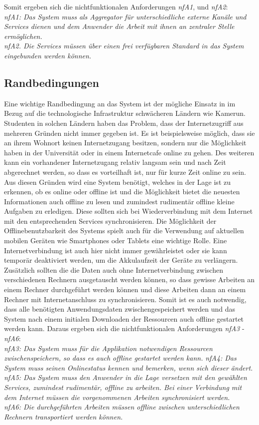 Somit ergeben sich die nichtfunktionalen Anforderungen \emph{nfA1}, und \emph{nfA2}:\\
\emph{nfA1: Das System muss als Aggregator für unterschiedliche externe Kanäle und Services dienen und dem Anwender die Arbeit mit ihnen an zentraler Stelle ermöglichen.}\\
\emph{nfA2. Die Services müssen über einen frei verfügbaren Standard in das System eingebunden werden können.}

\subsection{Randbedingungen}
Eine wichtige Randbedingung an das System ist der mögliche Einsatz in im Bezug auf die technologische Infrastruktur schwächeren Ländern wie Kamerun. Studenten in solchen Ländern  haben das Problem, dass der Internetzugriff aus mehreren Gründen nicht immer gegeben ist. Es ist beispielsweise möglich, dass sie an ihrem Wohnort keinen Internetzugang besitzen, sondern nur die Möglichkeit haben in der Universität oder in einem Internetcafe online zu gehen. Des weiteren kann ein vorhandener Internetzugang relativ langsam sein und nach Zeit abgerechnet werden, so dass es vorteilhaft ist, nur für kurze Zeit online zu sein. Aus diesen Gründen wird eine System benötigt, welches in der Lage ist zu erkennen, ob es online oder offline ist und die Möglichkeit bietet die neuesten Informationen auch offline zu lesen und zumindest rudimentär offline kleine Aufgaben zu erledigen. Diese sollten sich bei Wiederverbindung mit dem Internet mit den entsprechenden Services synchronisieren. Die Möglichkeit der Offlinebenutzbarkeit des Systems spielt auch für die Verwendung auf aktuellen mobilen Geräten wie Smartphones oder Tablets eine wichtige Rolle. Eine Internetverbindung ist auch hier nicht immer gewährleistet oder sie kann temporär deaktiviert werden, um die Akkulaufzeit der Geräte zu verlängern.
Zusätzlich sollten die die Daten auch ohne Internetverbindung zwischen verschiedenen Rechnern ausgetauscht werden können, so dass gewisse Arbeiten an einem Rechner durchgeführt werden können und diese Arbeiten dann an einem Rechner mit Internetanschluss zu synchronisieren. Somit ist es auch notwendig, dass alle benötigten Anwendungsdaten zwischengespeichert werden und das System nach einem initialen Downloaden der Ressourcen auch offline gestartet werden kann.
Daraus ergeben sich die nichtfunktionalen Anforderungen \emph{nfA3} - \emph{nfA6}:\\
\emph{nfA3: Das System muss für die Applikation notwendigen Ressourcen zwischenspeichern, so dass es auch offline gestartet werden kann.}
\emph{nfA4: Das System muss seinen Onlinestatus kennen und bemerken, wenn sich dieser ändert.}
\emph{nfA5: Das System muss den Anwender in die Lage versetzen mit den gewählten Services, zumindest rudimentär, offline zu arbeiten. Bei einer Verbindung mit dem Internet müssen die vorgenommenen Arbeiten synchronisiert werden.}\\
\emph{nfA6: Die durchgeführten Arbeiten müssen offline zwischen unterschiedlichen Rechnern transportiert werden können.}


